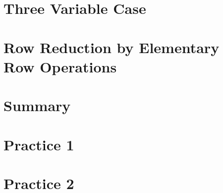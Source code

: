 \documentclass{article}
\begin{document}
\section{Three Variable Case}

\section{Row Reduction by Elementary Row Operations}

\section{Summary}

\section{Practice 1}

\section{Practice 2}
\end{document}
